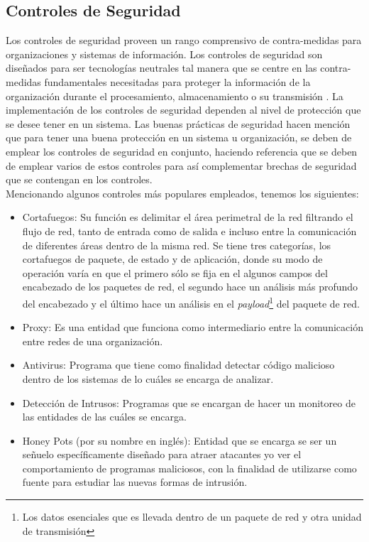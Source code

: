 \subsection{Controles de Seguridad}

Los controles de seguridad proveen un rango comprensivo de contra-medidas para organizaciones y sistemas de información. Los controles de seguridad son diseñados para ser tecnologías neutrales tal manera que se centre en las contra-medidas fundamentales necesitadas para proteger la información de la organización durante el procesamiento, almacenamiento o su transmisión \cite{nist53}. La implementación de los controles de seguridad dependen al nivel de protección que se desee tener en un sistema. Las buenas prácticas de seguridad hacen mención que para tener una buena protección en un sistema u organización, se deben de emplear los controles de seguridad en conjunto, haciendo referencia que se deben de emplear varios de estos controles para así complementar brechas de seguridad que se contengan en los controles.\\

Mencionando algunos controles más populares empleados, tenemos los siguientes: \\

\begin{itemize}

	\item Cortafuegos: Su función es delimitar el área perimetral de la red filtrando el flujo de red, tanto de entrada como de salida e incluso entre la comunicación de diferentes áreas dentro de la misma red. Se tiene tres categorías, los cortafuegos de paquete, de estado y de aplicación, donde su modo de operación varía en que el primero sólo se fija en el algunos campos del encabezado de los paquetes de red, el segundo hace un análisis más profundo del encabezado y el último hace un análisis en el \textit{payload}\footnote{Los datos esenciales que es llevada dentro de un paquete de red y otra unidad de transmisión} del paquete de red.
	
	\item Proxy: Es una entidad que funciona como intermediario entre la comunicación entre redes de una organización.
	
	\item Antivirus: Programa que tiene como finalidad detectar código malicioso dentro de los sistemas de lo cuáles se encarga de analizar.
	
	\item Detección de Intrusos: Programas que se encargan de hacer un monitoreo de las entidades de las cuáles se encarga.
	
	\item Honey Pots (por su nombre en inglés): Entidad que se encarga se ser un señuelo específicamente diseñado para atraer atacantes y\/o ver el comportamiento de programas maliciosos, con la finalidad de utilizarse como fuente para estudiar las nuevas formas de intrusión.

\end{itemize} 


\pagebreak